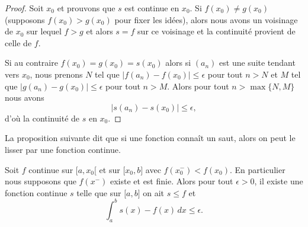 \begin{proof}
    Soit \( x_0\) et prouvons que \( s\) est continue en \( x_0\). Si \( f(x_0)\neq g(x_0)\) (supposons \( f(x_0)>g(x_0)\) pour fixer les idées), alors nous avons un voisinage de \( x_0\) sur lequel \( f>g\) et alors \( s=f\) sur ce voisinage et la continuité provient de celle de \( f\).

    Si au contraire \( f(x_0)=g(x_0)=s(x_0)\) alors si \( (a_n)\) est une suite tendant vers \( x_0\), nous prenons \( N\) tel que \( \big| f(a_n)-f(x_0) \big|\leq \epsilon\) pour tout \( n>N\) et \( M\) tel que \( \big| g(a_n)-g(x_0) \big|\leq \epsilon\) pour tout \( n> M\). Alors pour tout \( n>\max\{ N,M \}\) nous avons
    \begin{equation}
        \big| s(a_n)-s(x_0) \big|\leq \epsilon,
    \end{equation}
    d'où la continuité de \( s\) en \( x_0\).
\end{proof}

La proposition suivante dit que si une fonction connaît un saut, alors on peut le lisser par une fonction continue.
\begin{proposition} \label{PropTIeYVw}
    Soit \( f\) continue sur \( \mathopen[ a , x_0 [\) et sur \( \mathopen[ x_0 , b \mathclose]\) avec \( f(x_0^-)<f(x_0)\). En particulier nous supposons que \( f(x^-)\) existe et est finie. Alors pour tout \( \epsilon>0\), il existe une fonction continue \( s\) telle que sur \( \mathopen[ a , b \mathclose]\) on ait \( s\leq f\) et
    \begin{equation}
        \int_a^bs(x)-f(x)\,dx\leq \epsilon.
    \end{equation}
\end{proposition}


